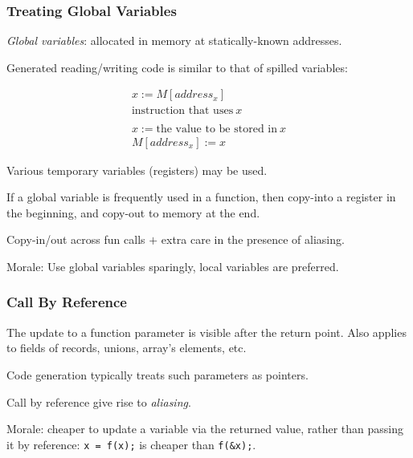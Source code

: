\documentclass{beamer}
\renewcommand{\emph}[1]{\textcolor{structure}{#1}}
\newcommand{\emp}[1]{\textcolor{DikuRed}{ #1}}
\begin{document}
\begin{frame}[fragile]
	\tableofcontents[currentsection]
\end{frame}

\begin{frame}
\frametitle{Treating Global Variables}

\emp{\em Global variables}: allocated in memory at statically-known addresses.\smallskip

Generated reading/writing code is similar to that of \emp{spilled variables}:\smallskip

\[\begin{array}{l}
x := M[address_{x}] \\
\mbox{instruction that uses}~ x\\
\\
x := \mbox{the value to be stored in}~x \\
M[address_{x}] := x
\end{array}\]

Various temporary variables (registers) may be used.\smallskip

If a global variable is frequently used in a function, then copy-into a
register in the beginning, and copy-out to memory at the end.\smallskip

Copy-in/out across fun calls $+$ extra care in the presence of \emp{aliasing}.

\bigskip

\emph{Morale: Use global variables sparingly, local variables are preferred.}

\end{frame}




\begin{frame}
\frametitle{Call By Reference}

\bigskip

The update to a function parameter is visible after the return point.
Also applies to fields of records, unions, array's elements, etc.\bigskip


Code generation typically treats such parameters as \emp{pointers}.\bigskip

Call by reference give rise to  {\em aliasing}.\bigskip

Morale: cheaper to update a variable via the returned value, rather than 
passing it by reference: \emp{{\tt x~=~f(x);} is cheaper than {\tt f(\&x);}.}

\end{frame}
\end{document}
